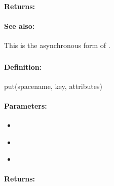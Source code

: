 \paragraph{Returns:}


\paragraph{See also:}  This is the asynchronous form of .

\pagebreak
\subsubsection{}
\label{api:ruby:put}


\paragraph{Definition:}
\begin{rubycode}
put(spacename, key, attributes)
\end{rubycode}

\paragraph{Parameters:}
\begin{itemize}[noitemsep]
\item {}\\

\item {}\\

\item {}\\

\end{itemize}

\paragraph{Returns:}


\pagebreak
\subsubsection{}
\label{api:ruby:async_put}


